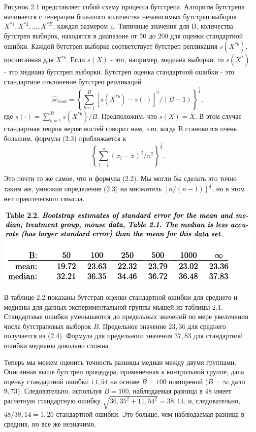 Рисунок 2.1 представляет собой схему процесса бутстрепа. Алгоритм бутстрепа начинается с генерации большого количества независимых бутстреп выборок $X^{*1}, X^{* 2},\ldots, X^{*B}$, каждая размером n. Типичные значения для B, количества бутстреп выборок, находятся в диапазоне от 50 до 200 для оценки стандартной ошибки. Каждой бутстреп выборке соответствует бутстреп репликация $s (X^{* b})$, посчитанная для $X^{* b}$. Если $s(X)$ - это, например, медиана выборки, то $s (X^*)$ - это медиана бутстреп выборки. Бутстреп оценка стандартной ошибки - это стандартное отклонение бутстреп репликаций  
\begin{equation}
    \hat{se}_{boot}=\left\{\sum_{b=1}^B [s(X^{*b})-s(\cdot)]^2/(B-1)\right\}^{\frac{1}{2}},
\end{equation}
где $s(\cdot)=\sum_{b=1}^B s(X^{*b})/B$. Предположим, что $s(X)=\overline X$. В этом случае стандартная теория вероятностей говорит нам, что, когда B становится очень большим, формула (2.3) приближается к  
\begin{equation}
    \left\{\sum_{i=1}^n (x_i-\overline x)^2/n^2\right\}^{\frac{1}{2}}.
\end{equation}

Это почти то же самое, что и формула (2.2). Мы могли бы сделать это точно таким же, умножив определение (2.3) на множитель $[n / (n-1)] ^\frac{1}{2}$, но в этом нет практического смысла. 
\newline

\noindent
\includegraphics[width=\linewidth]{1/t2.png}
\newline

В таблице 2.2 показаны бутстрап оценки стандартной ошибки для среднего и медианы для данных экспериментальной группы мышей из таблицы 2.1. Стандартные ошибки уменьшаются до предельных значений по мере увеличения числа бутстраповых выборок $B$. Предельное значение $23,36$ для среднего получается из (2.4). Формула для предельного значения $37,83$ для стандартной ошибки медианы довольно сложна. 

Теперь мы можем оценить точность разницы медиан между двумя группами. Описанная выше бутстреп процедура, примененная к контрольной группе, дала оценку стандартной ошибки $11,54$ на основе $B = 100$ повторений ($B = \infty$ дало $9,73$). Следовательно, используя $B = 100$, наблюдаемая разница в $48$ имеет расчетную стандартную ошибку $\sqrt{36,35^2 + 11,54^2} = 38,14$, и, следовательно, $48 / 38,14 = 1,26$ стандартной ошибки. Это больше, чем наблюдаемая разница в средних, но все же незначимо. 

